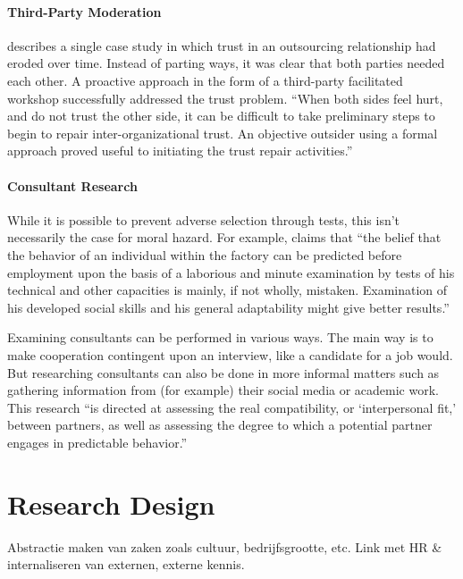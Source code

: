 \documentclass[12pt]{article}
\begin{document}
\paragraph{Third-Party Moderation}\label{third-party-moderation}

\citet[6-7]{babin2017} describes a single case study in which trust in
an outsourcing relationship had eroded over time. Instead of parting
ways, it was clear that both parties needed each other. A proactive
approach in the form of a third-party facilitated workshop successfully
addressed the trust problem. ``When both sides feel hurt, and do not
trust the other side, it can be difficult to take preliminary steps to
begin to repair inter-organizational trust. An objective outsider using
a formal approach proved useful to initiating the trust repair
activities.''

\paragraph{Consultant Research}\label{consultant-research}

While it is possible to prevent adverse selection through tests, this
isn't necessarily the case for moral hazard. For example,
\citet[111]{mayo1945} claims that ``the belief that the behavior of an
individual within the factory can be predicted before employment upon
the basis of a laborious and minute examination by tests of his
technical and other capacities is mainly, if not wholly, mistaken.
Examination of his developed social skills and his general adaptability
might give better results.''

Examining consultants can be performed in various ways. The main way is
to make cooperation contingent upon an interview, like a candidate for a
job would. But researching consultants can also be done in more informal
matters such as gathering information from (for example) their social
media or academic work. This research ``is directed at assessing the
real compatibility, or `interpersonal fit,' between partners, as well as
assessing the degree to which a potential partner engages in predictable
behavior.'' \citep[ 370]{shapiro1992}

\section{Research Design}\label{research-design}

Abstractie maken van zaken zoals cultuur, bedrijfsgrootte, etc. Link met
HR \& internaliseren van externen, externe kennis.
\end{document}
